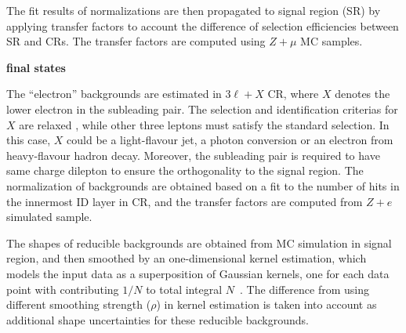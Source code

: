 The fit results of normalizations are then propagated to signal region (SR) by applying transfer factors to account the difference of selection efficiencies between SR and CRs.
The transfer factors are computed using $Z+\mu$ MC samples.

\textbf{\llee final states} 

The ``electron'' backgrounds are estimated in $3\ell+X$ CR, where $X$ denotes the lower \pt electron in the subleading pair.
The selection and identification criterias for $X$ are relaxed , while other three leptons must satisfy the standard selection.
In this case, $X$ could be a light-flavour jet, a photon conversion or an electron from heavy-flavour hadron decay.
Moreover, the subleading pair is required to have same charge dilepton to ensure the orthogonality to the signal region.
The normalization of backgrounds are obtained based on a fit to the number of hits in the innermost ID layer in CR,
and the transfer factors are computed from $Z+e$ simulated sample.

The \mfl shapes of reducible backgrounds are obtained from MC simulation in signal region, and then smoothed by an one-dimensional kernel estimation,
which models the input data as a superposition of Gaussian kernels, one for each data point with contributing $1/N$ to total integral $N$~\cite{Cranmer:2000du}.
The difference from using different smoothing strength ($\rho$) in kernel estimation is taken into account as additional shape uncertainties for these reducible backgrounds.
